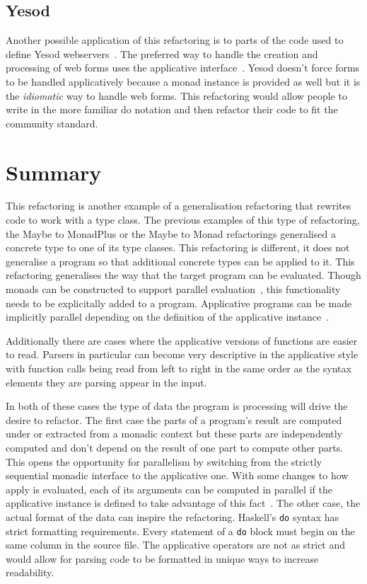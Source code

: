 \subsection{Yesod}
Another possible application of this refactoring is to parts of the code used to define Yesod webservers~\citep{yesod}. The preferred way to handle the creation and processing of web forms uses the applicative interface~\citep{yesodBook}. Yesod doesn't force forms to be handled applicatively because a monad instance is provided as well but it is the \textit{idiomatic} way to handle web forms. This refactoring would allow people to write in the more familiar do notation and then refactor their code to fit the community standard.

\section{Summary}

This refactoring is another example of a generalisation refactoring that rewrites code to work with a type class. The previous examples of this type of refactoring, the Maybe to MonadPlus or the Maybe to Monad refactorings generalised a concrete type to one of its type classes. This refactoring is different, it does not generalise a program so that additional concrete types can be applied to it. This refactoring generalises the way that the target program can be evaluated. Though monads can be constructed to support parallel evaluation~\citep{parMonad}, this functionality needs to be explicitally added to a program. Applicative programs can be made implicitly parallel depending on the definition of the applicative instance~\citep{haxl}. 

Additionally there are cases where the applicative versions of functions are easier to read. Parsers in particular can become very descriptive in the applicative style with function calls being read from left to right in the same order as the syntax elements they are parsing appear in the input. 

In both of these cases the type of data the program is processing will drive the desire to refactor. The first case the parts of a program's result are computed under or extracted from a monadic context but these parts are independently computed and don't depend on the result of one part to compute other parts. This opens the opportunity for parallelism by switching from the strictly sequential monadic interface to the applicative one. With some changes to how apply is evaluated, each of its arguments can be computed in parallel if the applicative instance is defined to take advantage of this fact~\citep{haxl}. The other case, the actual format of the data can inspire the refactoring. Haskell's \texttt{do} syntax has strict formatting requirements. Every statement of a \texttt{do} block must begin on the same column in the source file. The applicative operators are not as strict and would allow for parsing code to be formatted in unique ways to increase readability. 


